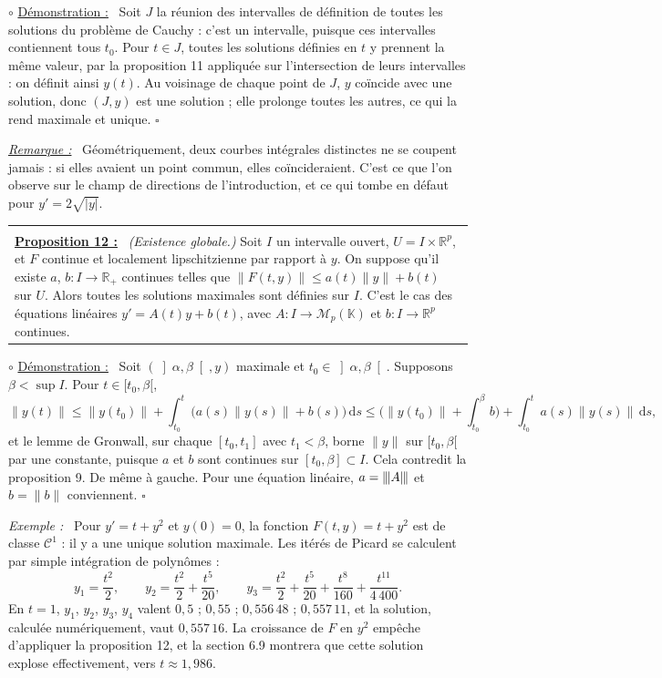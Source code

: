 \documentclass[a4paper,twoside]{report}
\makeatletter
\newenvironment{cadre}%
 {\par\vspace{2mm}\noindent\begin{tabular}{|@{\hspace{4mm}}p{0.93\textwidth}@{\hspace{4mm}}|}
  \hline \\[-2mm]}%
 {\\[2mm] \hline \end{tabular}\par\vspace{3mm}}
\newcommand{\propo}[1]{\textbf{\underline{Proposition #1 :}}~}
\newenvironment{demo}%
 {\par\needspace{4\baselineskip}\vspace{1mm}\noindent$\circ$ \underline{Démonstration :}~\setlength{\parskip}{3pt plus 1pt}}%
 {\hfill$\square$\par\vspace{2mm}}
\newenvironment{exemple}%
 {\par\needspace{6\baselineskip}\vspace{1mm}\begin{list}{}{\leftmargin=1cm \rightmargin=0.5cm}\item[]%
  \textit{Exemple :}~}%
 {\end{list}\vspace{1mm}}
\newenvironment{remarque}%
 {\par\needspace{6\baselineskip}\vspace{1mm}\begin{list}{}{\leftmargin=1cm \rightmargin=0.5cm}\item[]%
  \textit{\underline{Remarque :}}~}%
 {\end{list}\vspace{1mm}}
\newcommand{\R}{\mathbb{R}}
\newcommand{\K}{\mathbb{K}}                       %
\newcommand{\dd}{\mathrm{d}}                      %
\newcommand{\Mn}[1]{\mathcal{M}_{#1}(\K)}          %
\newcommand{\norme}[1]{\lVert #1 \rVert}         %
\newcommand{\nop}[1]{|\mkern-1.5mu|\mkern-1.5mu|#1|\mkern-1.5mu|\mkern-1.5mu|}   %
\newcommand{\Cc}{\mathcal{C}}                     %
\makeatother
\begin{document}
\begin{demo}
Soit $J$ la réunion des intervalles de définition de toutes les solutions du problème de Cauchy : c'est un intervalle, puisque ces intervalles contiennent tous $t_{0}$. Pour $t \in J$, toutes les solutions définies en $t$ y prennent la même valeur, par la proposition 11 appliquée sur l'intersection de leurs intervalles : on définit ainsi $y(t)$. Au voisinage de chaque point de $J$, $y$ coïncide avec une solution, donc $(J, y)$ est une solution ; elle prolonge toutes les autres, ce qui la rend maximale et unique.
\end{demo}

\begin{remarque}
Géométriquement, deux courbes intégrales distinctes ne se coupent jamais : si elles avaient un point commun, elles coïncideraient. C'est ce que l'on observe sur le champ de directions de l'introduction, et ce qui tombe en défaut pour $y' = 2\sqrt{|y|}$.
\end{remarque}

\begin{cadre}
\propo{12} \emph{(Existence globale.)} Soit $I$ un intervalle ouvert, $U = I \times \R^{p}$, et $F$ continue et localement lipschitzienne par rapport à $y$. On suppose qu'il existe $a$, $b : I \to \R_{+}$ continues telles que $\norme{F(t, y)} \leqslant a(t)\norme{y} + b(t)$ sur $U$. Alors toutes les solutions maximales sont définies sur $I$. C'est le cas des équations linéaires $y' = A(t)y + b(t)$, avec $A : I \to \Mn{p}$ et $b : I \to \R^{p}$ continues.
\end{cadre}

\begin{demo}
Soit $(\left]\alpha, \beta\right[, y)$ maximale et $t_{0} \in \left]\alpha, \beta\right[$. Supposons $\beta < \sup I$. Pour $t \in [t_{0}, \beta[$,
\[ \norme{y(t)} \leqslant \norme{y(t_{0})} + \int_{t_{0}}^{t} \big(a(s)\norme{y(s)} + b(s)\big)\,\dd s \leqslant \Big(\norme{y(t_{0})} + \int_{t_{0}}^{\beta} b\Big) + \int_{t_{0}}^{t} a(s)\norme{y(s)}\,\dd s, \]
et le lemme de Gronwall, sur chaque $[t_{0}, t_{1}]$ avec $t_{1} < \beta$, borne $\norme{y}$ sur $[t_{0}, \beta[$ par une constante, puisque $a$ et $b$ sont continues sur $[t_{0}, \beta] \subset I$. Cela contredit la proposition 9. De même à gauche. Pour une équation linéaire, $a = \nop{A}$ et $b = \norme{b}$ conviennent.
\end{demo}

\begin{exemple}
Pour $y' = t + y^{2}$ et $y(0) = 0$, la fonction $F(t, y) = t + y^{2}$ est de classe $\Cc^{1}$ : il y a une unique solution maximale. Les itérés de Picard se calculent par simple intégration de polynômes :
\[ y_{1} = \frac{t^{2}}{2}, \qquad y_{2} = \frac{t^{2}}{2} + \frac{t^{5}}{20}, \qquad y_{3} = \frac{t^{2}}{2} + \frac{t^{5}}{20} + \frac{t^{8}}{160} + \frac{t^{11}}{4\,400}. \]
En $t = 1$, $y_{1}$, $y_{2}$, $y_{3}$, $y_{4}$ valent $0{,}5$ ; $0{,}55$ ; $0{,}556\,48$ ; $0{,}557\,11$, et la solution, calculée numériquement, vaut $0{,}557\,16$. La croissance de $F$ en $y^{2}$ empêche d'appliquer la proposition 12, et la section 6.9 montrera que cette solution explose effectivement, vers $t \approx 1{,}986$.
\end{exemple}
\end{document}
